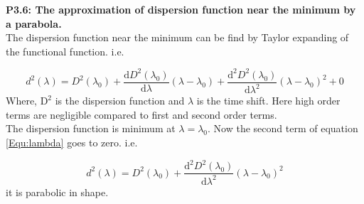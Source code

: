   
  \textbf{P3.6: The approximation of dispersion function near the minimum by a parabola.}\\
  
  The dispersion function near the minimum can be find by Taylor expanding of the functional function. i.e.
  
  \begin{equation}
  d^2(\lambda)=D^2(\lambda_{0}) +\frac{\text{d}D^2(\lambda_{0})}{\text{d}\lambda}(\lambda- \lambda_{0}) + \frac{\text{d}^2 D^2(\lambda_{0})}{\text{d}\lambda^2}(\lambda - \lambda_{0})^2 + 0
  \label{Equ:lambda}
  \end{equation}
  Where, $ \text{D}^2 $ is the dispersion function and $ \lambda $ is the time shift.
  Here high order terms are negligible compared to first and second order terms.\\
  
  The dispersion function is minimum at $ \lambda= \lambda_{0} $. Now the second term of equation \ref{Equ:lambda} goes to zero. i.e.
  
  \begin{equation}
  d^2(\lambda)=D^2(\lambda_{0}) + \frac{\text{d}^2 D^2(\lambda_{0})}{\text{d}\lambda^2}(\lambda - \lambda_{0})^2 
  \end{equation}
  it is parabolic in shape.